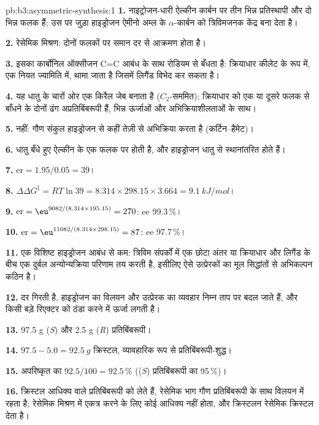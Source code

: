 \begin{solution}{pb:b3:asymmetric-synthesis:1}
\textbf{1.} नाइट्रोजन-धारी ऐल्कीन कार्बन पर तीन भिन्न प्रतिस्थापी
और दो भिन्न फलक हैं; उस पर जुड़ा हाइड्रोजन ऐमीनो
अम्ल के $\alpha$-कार्बन को त्रिविमजनक केंद्र बना देता है।

\textbf{2.} रेसेमिक मिश्रण: दोनों फलकों पर समान दर से आक्रमण होता है।

\textbf{3.} इसका कार्बोनिल ऑक्सीजन C=C आबंध के साथ रोडियम से बँधता है: क्रियाधार
कीलेट के रूप में, एक नियत ज्यामिति में, थामा जाता है जिसमें लिगैंड विभेद कर सकता है।

\textbf{4.} यह धातु के चारों ओर एक किरैल जेब बनाता है ($C_2$-सममित): क्रियाधार को
एक या दूसरे फलक से बाँधने के दोनों ढंग अप्रतिबिंबरूपी हैं, भिन्न
ऊर्जाओं और अभिक्रियाशीलताओं के साथ।

\textbf{5.} नहीं: गौण संकुल हाइड्रोजन से कहीं तेज़ी से अभिक्रिया करता है (कर्टिन--हैमेट)।

\textbf{6.} धातु बँधे हुए ऐल्कीन के एक फलक पर होती है, और हाइड्रोजन
धातु से स्थानांतरित होते हैं।

\textbf{7.} $\mathrm{er} = 1.95/0.05 = 39$।

\textbf{8.} $\Delta\Delta G^\ddagger = RT\ln 39 = 8.314 \times 298.15 \times 3.664 = \qty{9.1}{kJ/mol}$।

\textbf{9.} $\mathrm{er} = \eu^{9082/(8.314 \times 195.15)} = 270$: ee 99.3\,\%।

\textbf{10.} $\mathrm{er} = \eu^{11082/(8.314 \times 298.15)} = 87$: ee 97.7\,\%।

\textbf{11.} एक विशिष्ट हाइड्रोजन आबंध से कम: त्रिविम संपर्कों में एक छोटा अंतर
या क्रियाधार और लिगैंड के बीच एक दुर्बल अन्योन्यक्रिया परिणाम तय करती है,
इसीलिए ऐसे उत्प्रेरकों का मूल सिद्धांतों से अभिकल्पन कठिन है।

\textbf{12.} दर गिरती है, हाइड्रोजन का विलयन और उत्प्रेरक का व्यवहार
निम्न ताप पर बदल जाते हैं, और किसी बड़े रिएक्टर को ठंडा करने में ऊर्जा लगती है।

\textbf{13.} 97.5 g (\textit{S}) और 2.5 g (\textit{R}) प्रतिबिंबरूपी।

\textbf{14.} $97.5 - 5.0 = \qty{92.5}{g}$ क्रिस्टल, व्यावहारिक रूप से प्रतिबिंबरूपी-शुद्ध।

\textbf{15.} अपरिष्कृत का $92.5/100 = 92.5$\,\% ((\textit{S}) प्रतिबिंबरूपी का 95\,\%)।

\textbf{16.} क्रिस्टल आधिक्य वाले प्रतिबिंबरूपी को लेते हैं, रेसेमिक भाग गौण प्रतिबिंबरूपी के साथ
विलयन में रहता है; रेसेमिक मिश्रण में एकत्र करने के लिए कोई आधिक्य नहीं होता, और
क्रिस्टलन रेसेमिक क्रिस्टल देता है।


\end{solution}
